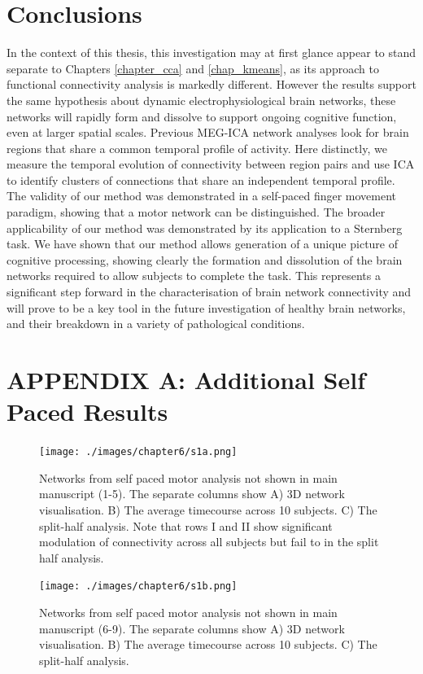 \section{Conclusions}

In the context of this thesis, this investigation may at first glance appear to stand separate to Chapters \ref{chapter_cca} and \ref{chap_kmeans}, as its approach to functional connectivity analysis is markedly different. However the results support the same hypothesis about dynamic electrophysiological brain networks, these networks will rapidly form and dissolve to support ongoing cognitive function, even at larger spatial scales. Previous MEG-ICA network analyses look for brain regions that share a common temporal profile of activity. Here distinctly, we measure the temporal evolution of connectivity between region pairs and use ICA to identify clusters of connections that share an independent temporal profile. The validity of our method was demonstrated in a self-paced finger movement paradigm, showing that a motor network can be distinguished. The broader applicability of our method was demonstrated by its application to a Sternberg task. We have shown that our method allows generation of a unique picture of cognitive processing, showing clearly the formation and dissolution of the brain networks required to allow subjects to complete the task. This represents a significant step forward in the characterisation of brain network connectivity and will prove to be a key tool in the future investigation of healthy brain networks, and their breakdown in a variety of pathological conditions.
\clearpage

\appsection
\section{APPENDIX A: Additional Self Paced Results}\label{sec_atlas_appendix_A}
\begin{figure}[h!]
	\texttt{[image: ./images/chapter6/s1a.png]}\caption{Networks from self paced motor analysis not shown in main manuscript (1-5). The separate columns show A) 3D network visualisation. B) The average timecourse across 10 subjects. C) The split-half analysis. Note that rows I and II show significant modulation of connectivity across all subjects but fail to in the split half analysis.}
\end{figure}
\begin{figure}[h!]
	\texttt{[image: ./images/chapter6/s1b.png]}\caption{Networks from self paced motor analysis not shown in main manuscript (6-9). The separate columns show A) 3D network visualisation. B) The average timecourse across 10 subjects. C) The split-half analysis.}
\end{figure}
